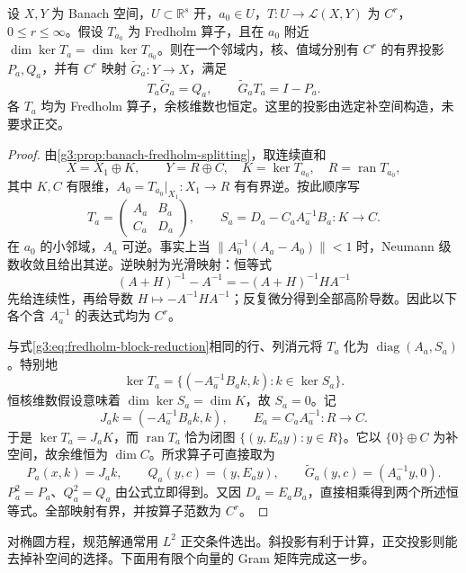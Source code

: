 \begin{theorem}\label{g3:thm:parameter-fredholm-constant-kernel}
	设 \(X,Y\) 为 Banach 空间，\(U\subset\mathbb R^s\) 开，\(a_0\in U\)，\(T:U\to\mathcal L(X,Y)\) 为 \(C^r\)，\(0\le r\le\infty\)。假设 \(T_{a_0}\) 为 Fredholm 算子，且在 \(a_0\) 附近 \(\dim\ker T_a=\dim\ker T_{a_0}\)。则在一个邻域内，核、值域分别有 \(C^r\) 的有界投影 \(P_a,Q_a\)，并有 \(C^r\) 映射 \(\widetilde G_a:Y\to X\)，满足
	\[
		T_a\widetilde G_a=Q_a,\qquad
		\widetilde G_aT_a=I-P_a.
	\]
	各 \(T_a\) 均为 Fredholm 算子，余核维数也恒定。这里的投影由选定补空间构造，未要求正交。
\end{theorem}
\begin{proof}
	由\cref{g3:prop:banach-fredholm-splitting}，取连续直和
	\[
		X=X_1\oplus K,\qquad Y=R\oplus C,
		\quad K=\ker T_{a_0},\quad R=\operatorname{ran}T_{a_0},
	\]
	其中 \(K,C\) 有限维，\(A_0=T_{a_0}|_{X_1}:X_1\to R\) 有有界逆。按此顺序写
	\[
		T_a=\begin{pmatrix}A_a&B_a\\ C_a&D_a\end{pmatrix},
		\qquad S_a=D_a-C_aA_a^{-1}B_a:K\to C.
	\]
	在 \(a_0\) 的小邻域，\(A_a\) 可逆。事实上当
	\(\|A_0^{-1}(A_a-A_0)\|<1\) 时，Neumann 级数收敛且给出其逆。逆映射为光滑映射：恒等式
	\[
		(A+H)^{-1}-A^{-1}=-(A+H)^{-1}HA^{-1}
	\]
	先给连续性，再给导数 \(H\mapsto-A^{-1}HA^{-1}\)；反复微分得到全部高阶导数。因此以下各个含 \(A_a^{-1}\) 的表达式均为 \(C^r\)。

	与式\eqref{g3:eq:fredholm-block-reduction}相同的行、列消元将 \(T_a\) 化为 \(\operatorname{diag}(A_a,S_a)\)。特别地
	\[
		\ker T_a=\{(-A_a^{-1}B_ak,k):k\in\ker S_a\}.
	\]
	恒核维数假设意味着 \(\dim\ker S_a=\dim K\)，故 \(S_a=0\)。记
	\[
		J_ak=(-A_a^{-1}B_ak,k),\qquad E_a=C_aA_a^{-1}:R\to C.
	\]
	于是 \(\ker T_a=J_aK\)，而 \(\operatorname{ran}T_a\) 恰为闭图
	\(\{(y,E_ay):y\in R\}\)。它以 \(\{0\}\oplus C\) 为补空间，故余维恒为 \(\dim C\)。所求算子可直接取为
	\begin{equation}\label{g3:eq:parameter-oblique-green}
		P_a(x,k)=J_ak,\qquad
		Q_a(y,c)=(y,E_ay),\qquad
		\widetilde G_a(y,c)=(A_a^{-1}y,0).
	\end{equation}
	\(P_a^2=P_a\)、\(Q_a^2=Q_a\) 由公式立即得到。又因 \(D_a=E_aB_a\)，直接相乘得到两个所述恒等式。全部映射有界，并按算子范数为 \(C^r\)。
\end{proof}

对椭圆方程，规范解通常用 \(L^2\) 正交条件选出。斜投影有利于计算，正交投影则能去掉补空间的选择。下面用有限个向量的 Gram 矩阵完成这一步。

